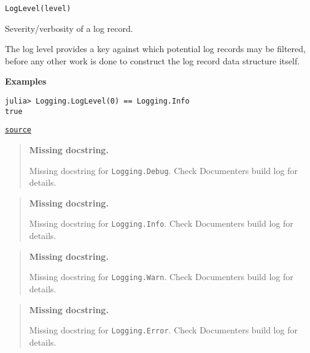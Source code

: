 \begin{adjustwidth}{2em}{0pt}


\begin{verbatim}
LogLevel(level)
\end{verbatim}

Severity/verbosity of a log record.

The log level provides a key against which potential log records may be filtered, before any other work is done to construct the log record data structure itself.

\textbf{Examples}


\begin{verbatim}
julia> Logging.LogLevel(0) == Logging.Info
true
\end{verbatim}



\href{https://github.com/JuliaLang/julia/blob/9058264a69f9efc1af805c4473c946f87859b731/base/logging.jl#L109-L123}{\texttt{source}}


\end{adjustwidth}

\begin{quote}
\textbf{Missing docstring.}

Missing docstring for \texttt{Logging.Debug}. Check Documenter{\textquotesingle}s build log for details.

\end{quote}


\begin{quote}
\textbf{Missing docstring.}

Missing docstring for \texttt{Logging.Info}. Check Documenter{\textquotesingle}s build log for details.

\end{quote}


\begin{quote}
\textbf{Missing docstring.}

Missing docstring for \texttt{Logging.Warn}. Check Documenter{\textquotesingle}s build log for details.

\end{quote}


\begin{quote}
\textbf{Missing docstring.}

Missing docstring for \texttt{Logging.Error}. Check Documenter{\textquotesingle}s build log for details.

\end{quote}


\hypertarget{10335028777960461011}{}


